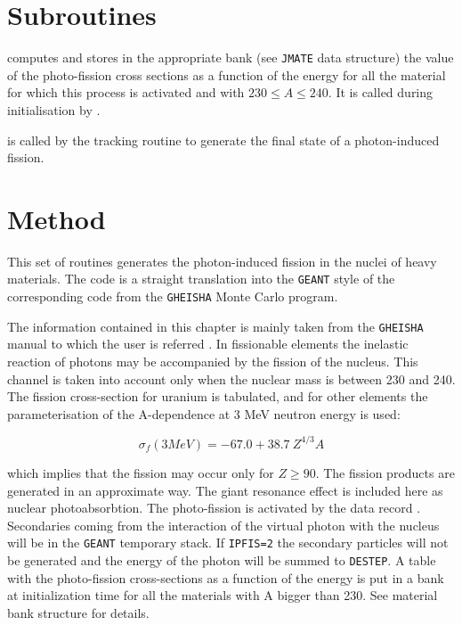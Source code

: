 \section{Subroutines}
 computes and stores in the appropriate bank (see {\tt JMATE} 
data structure) the value of the photo-fission cross sections as a 
function of the energy for all the material for which this process
is activated and with $230 \leq A \leq 240$. 
It is called during initialisation by .

 is called by the tracking routine  to generate
the final state of a photon-induced fission.

\section{Method}
 
This set of routines generates the photon-induced fission in the nuclei of
heavy materials. The code is a straight translation into the {\tt GEANT} style 
of the corresponding code from the {\tt GHEISHA} Monte Carlo program.
 
The information contained in this chapter is mainly taken from the
{\tt GHEISHA} manual to which the user is referred \cite{bib-GHEI}.
In fissionable elements the inelastic reaction of photons may be
accompanied by the fission of the nucleus. This channel is taken into account
only when the nuclear mass is between 230 and 240. The fission cross-section for
uranium is tabulated, and for other elements the parameterisation of the
A-dependence at 3 MeV neutron energy is used:
 
\[
 \sigma_f ( 3 MeV ) = - 67.0+38.7 \:  Z^{4/3 } A
\]

which implies that the fission may occur only for $ Z \geq 90$. The fission 
products are generated in an approximate way. The giant resonance effect is
included here as nuclear photoabsorbtion.
The photo-fission is activated 
by the data record . 
Secondaries coming from the interaction of the virtual
photon with the nucleus will be in the {\tt GEANT} temporary stack. 
If {\tt IPFIS=2} 
the secondary particles will not be generated and the
energy of the photon will be summed to {\tt DESTEP}.
A table with the photo-fission cross-sections as a function of the
energy is put in a bank at initialization time for all the materials with A
bigger than 230. See material bank structure for details.
